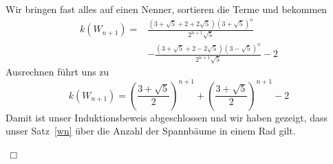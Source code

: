 Wir bringen fast alles auf einen Nenner, sortieren die Terme und bekommen
\begin{equation}
\begin{aligned}
\mathit{k}\left(W_{n+1}\right) = {}  & \frac{\left(3+\sqrt{5}+2+2\sqrt{5}\right)\left(3+\sqrt{5}\right)^{n}}{2^{n+1}\sqrt{5}} \\%
                        & -\frac{\left(3+\sqrt{5}+2-2\sqrt{5}\right)\left(3-\sqrt{5}\right)^{n}}{2^{n+1}\sqrt{5}}-2 
\end{aligned}
\end{equation}
Ausrechnen führt uns zu\\
\begin{equation}
\mathit{k}\left(W_{n+1}\right) = \left(\frac{3+\sqrt{5}}{2}\right)^{n+1}+\left(\frac{3+\sqrt{5}}{2}\right)^{n+1}-2
\end{equation}
Damit ist unser Induktionsbeweis abgeschlossen und wir haben gezeigt, dass unser Satz~\ref{wn} über die Anzahl der Spannbäume in einem Rad gilt.
\begin{flushright} $\,\Box\,$ \end{flushright} 
